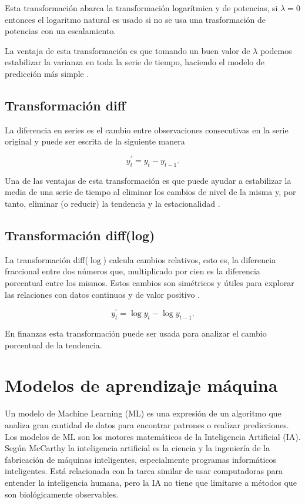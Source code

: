Esta transformación abarca la transformación logarítmica y de potencias, si $\lambda = 0$ entonces el logaritmo natural es usado si no se usa una trasformación de potencias con un escalamiento.

La ventaja de esta transformación es que tomando un buen valor de $\lambda$ podemos estabilizar la varianza en toda la serie de tiempo, haciendo el modelo de predicción más simple \parencite{hyndmanForecastingPrinciplesPractice2018}. 

\subsection{Transformación diff}

La diferencia en series es el cambio entre observaciones consecutivas en la serie original y puede ser escrita de la siguiente manera

\[
y_{t}^{\prime}=y_{t}-y_{t-1}.
\]

Una de las ventajas de esta transformación es que puede ayudar a estabilizar la media de una serie de tiempo al eliminar los cambios de nivel de la misma y, por tanto, eliminar (o reducir) la tendencia y la estacionalidad \parencite{hyndmanForecastingPrinciplesPractice2018}.

\subsection{Transformación diff(log)}

La transformación diff($\log$) calcula cambios relativos, esto es, la diferencia fraccional entre dos números que, multiplicado por cien es la diferencia porcentual entre los mismos. Estos cambios son simétricos y útiles para explorar las relaciones con datos continuos y de valor positivo \parencite{coleStatisticsNotesPercentage2017}.

\[
y_{t}^{\prime}=\log{y_{t}}-\log{y_{t-1}}.
\]

En finanzas esta transformación puede ser usada para analizar el cambio porcentual de la tendencia.


\section{Modelos de aprendizaje máquina}
\label{modelosmachinelearning}
Un modelo de Machine Learning (ML) es una expresión de un algoritmo que analiza gran cantidad de datos para encontrar patrones o realizar predicciones. Los modelos de ML son los motores matemáticos de la Inteligencia Artificial (IA).
Según McCarthy \parencite*{mccarthyWHATARTIFICIALINTELLIGENCE2004} la inteligencia artificial es la ciencia y la ingeniería de la fabricación de máquinas inteligentes, especialmente programas informáticos inteligentes. Está relacionada con la tarea similar de usar computadoras para entender la inteligencia humana, pero la IA no tiene que limitarse a métodos que son biológicamente observables.

